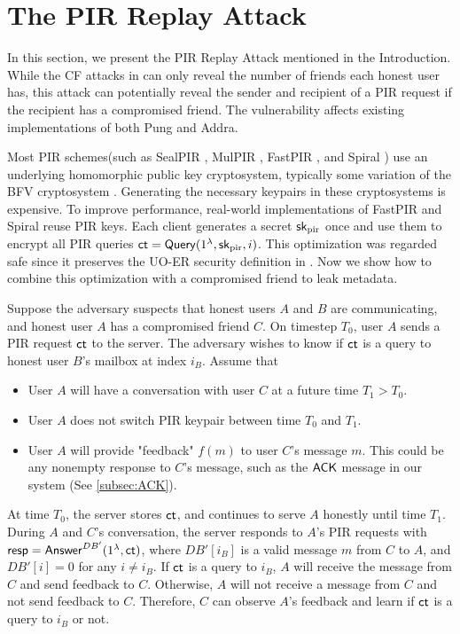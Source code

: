 \section{The PIR Replay Attack}
\label{sec:security-vulnerable}

In this section, we present the PIR Replay Attack mentioned in the Introduction. While the CF attacks in \cite{angel2018cf} can only reveal the number of friends each honest user has, this attack can potentially reveal the sender and recipient of a PIR request if the recipient has a compromised friend. The vulnerability affects existing implementations of both Pung and Addra.

Most PIR schemes(such as SealPIR \cite{angel2018pir}, MulPIR \cite{ali2021communicationcomputation}, FastPIR \cite{ahmad2021addra}, and Spiral \cite{wu2022spiral}) use an underlying homomorphic public key cryptosystem, typically some variation of the BFV cryptosystem \cite{fan2012somewhat}. Generating the necessary keypairs in these cryptosystems is expensive. To improve performance, real-world implementations of FastPIR and Spiral reuse PIR keys. Each client generates a secret ${\mathsf{sk}}_{\text{pir}}$ once and use them to encrypt all PIR queries $\mathsf{ct} = \mathsf{Query}(1^{\lambda}, {\mathsf{sk}}_{\text{pir}}, i)$. This optimization was regarded safe since it preserves the UO-ER security definition in \cite[Extended Version]{angel2016unobservable}. Now we show how to combine this optimization with a compromised friend to leak metadata.

Suppose the adversary suspects that honest users $A$ and $B$ are communicating, and honest user $A$ has a compromised friend $C$. On timestep $T_0$, user $A$ sends a PIR request $\mathsf{ct}$ to the server. The adversary wishes to know if $\mathsf{ct}$ is a query to honest user $B$'s mailbox at index $i_B$. Assume that
\begin{itemize}
    \item User $A$ will have a conversation with user $C$ at a future time $T_1 > T_0$. 
    \item User $A$ does not switch PIR keypair between time $T_0$ and $T_1$.
    \item User $A$ will provide "feedback" $f(m)$ to user $C$'s message $m$. This could be any nonempty response to $C$'s message, such as the $\mathsf{ACK}$ message in our system (See \cref{subsec:ACK}).
\end{itemize}
At time $T_0$, the server stores $\mathsf{ct}$, and continues to serve $A$ honestly until time $T_1$. During $A$ and $C$'s conversation, the server responds to $A$'s PIR requests with $\mathsf{resp} = \mathsf{Answer}^{DB'}(1^{\lambda}, \mathsf{ct})$, where $DB'[i_B]$ is a valid message $m$ from $C$ to $A$, and $DB'[i] = 0$ for any $i \neq i_B$. If $\mathsf{ct}$ is a query to $i_B$, $A$ will receive the message from $C$ and send feedback to $C$. Otherwise, $A$ will not receive a message from $C$ and not send feedback to $C$. Therefore, $C$ can observe $A$'s feedback and learn if $\mathsf{ct}$ is a query to $i_B$ or not.

